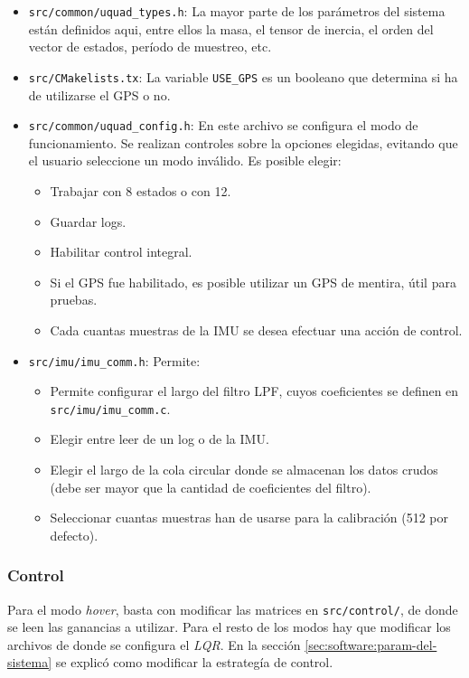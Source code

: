 \documentclass[main]{subfiles}
\begin{document}
\begin{itemize}
\item \verb+src/common/uquad_types.h+: La mayor parte de los par\'ametros del sistema est\'an definidos aqui, entre ellos la masa, el tensor de inercia, el orden del vector de estados, per\'iodo de muestreo, etc.

\item \verb+src/CMakelists.tx+: La variable \verb+USE_GPS+ es un booleano que determina si ha de utilizarse el GPS o no.

\item \verb+src/common/uquad_config.h+: En este archivo se configura el modo de funcionamiento. Se realizan controles sobre la opciones elegidas, evitando que el usuario seleccione un modo inv\'alido. Es posible elegir:
  \begin{itemize}
  \item Trabajar con 8 estados o con 12.
  \item Guardar logs.
  \item Habilitar control integral.
  \item Si el GPS fue habilitado, es posible utilizar un GPS de mentira, \'util para pruebas.
  \item Cada cuantas muestras de la IMU se desea efectuar una acci\'on de control.
  \end{itemize}

\item \verb+src/imu/imu_comm.h+: Permite:
  \begin{itemize}
  \item Permite configurar el largo del filtro LPF, cuyos coeficientes se definen en \verb+src/imu/imu_comm.c+.
  \item Elegir entre leer de un log o de la IMU.
  \item Elegir el largo de la cola circular donde se almacenan los datos crudos (debe ser mayor que la cantidad de coeficientes del filtro).
  \item Seleccionar cuantas muestras han de usarse para la calibraci\'on (512 por defecto).
  \end{itemize}
\end{itemize}

\subsubsection{Control}
\label{sec:software:config-control}

Para el modo \textit{hover}, basta con modificar las matrices en \verb+src/control/+, de donde se leen las ganancias a utilizar. Para el resto de los modos hay que modificar los archivos de donde se configura el \textit{LQR}. En la secci\'on \ref{sec:software:param-del-sistema} se explic\'o como modificar la estrateg\'ia de control.
\end{document}

